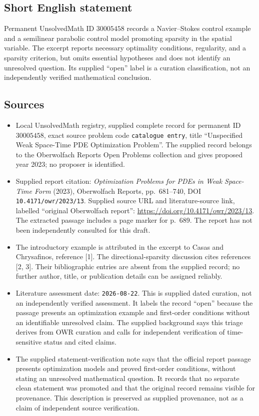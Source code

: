 \documentclass[11pt]{article}
\begin{document}
\subsection{Short English statement}
Permanent UnsolvedMath ID \(30005458\) records a Navier--Stokes control example and a semilinear parabolic control model promoting sparsity in the spatial variable. The excerpt reports necessary optimality conditions, regularity, and a sparsity criterion, but omits essential hypotheses and does not identify an unresolved question. Its supplied ``open'' label is a curation classification, not an independently verified mathematical conclusion.
\subsection{Sources}
\begin{itemize}
\item Local UnsolvedMath registry, supplied complete record for permanent ID \(30005458\), exact source problem code \texttt{catalogue entry}, title ``Unspecified Weak Space-Time PDE Optimization Problem''. The supplied record belongs to the Oberwolfach Reports Open Problems collection and gives proposed year 2023; no proposer is identified.
\item Supplied report citation: \emph{Optimization Problems for PDEs in Weak Space-Time Form} (2023), Oberwolfach Reports, pp.\ 681--740, DOI \texttt{10.4171/owr/2023/13}. Supplied source URL and literature-source link, labelled ``original Oberwolfach report'': \url{https://doi.org/10.4171/owr/2023/13}. The extracted passage includes a page marker for p.\ 689. The report has not been independently consulted for this draft.
\item The introductory example is attributed in the excerpt to Casas and Chrysafinos, reference [1]. The directional-sparsity discussion cites references [2, 3]. Their bibliographic entries are absent from the supplied record; no further author, title, or publication details can be assigned reliably.
\item Literature assessment date: \texttt{2026-08-22}. This is supplied dated curation, not an independently verified assessment. It labels the record ``open'' because the passage presents an optimization example and first-order conditions without an identifiable unresolved claim. The supplied background says this triage derives from OWR curation and calls for independent verification of time-sensitive status and cited claims.
\item The supplied statement-verification note says that the official report passage presents optimization models and proved first-order conditions, without stating an unresolved mathematical question. It records that no separate clean statement was promoted and that the original record remains visible for provenance. This description is preserved as supplied provenance, not as a claim of independent source verification.
\end{itemize}
\end{document}
